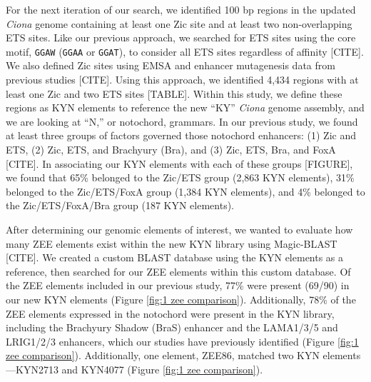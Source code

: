 For the next iteration of our search, we identified 100 bp regions in the updated \textit{Ciona} genome containing at least one Zic site and at least two non-overlapping ETS sites. Like our previous approach, we searched for ETS sites using the core motif, \verb|GGAW| (\verb|GGAA| or \verb|GGAT|), to consider all ETS sites regardless of affinity [CITE]. We also defined Zic sites using EMSA and enhancer mutagenesis data from previous studies [CITE]. Using this approach, we identified 4,434 regions with at least one Zic and two ETS sites [TABLE]. Within this study, we define these regions as KYN elements to reference the new “KY” \textit{Ciona} genome assembly, and we are looking at “N,” or notochord, grammars. In our previous study, we found at least three groups of factors governed those notochord enhancers: (1) Zic and ETS, (2) Zic, ETS, and Brachyury (Bra), and (3) Zic, ETS, Bra, and FoxA [CITE]. In associating our KYN elements with each of these groups [FIGURE], we found that 65\% belonged to the Zic/ETS group (2,863 KYN elements), 31\% belonged to the Zic/ETS/FoxA group (1,384 KYN elements), and 4\% belonged to the Zic/ETS/FoxA/Bra group (187 KYN elements). 

After determining our genomic elements of interest, we wanted to evaluate how many ZEE elements exist within the new KYN library using Magic-BLAST [CITE]. We created a custom BLAST database using the KYN elements as a reference, then searched for our ZEE elements within this custom database. Of the ZEE elements included in our previous study, 77\% were present (69/90) in our new KYN elements (Figure \ref{fig:1 zee comparison}). Additionally, 78\% of the ZEE elements expressed in the notochord were present in the KYN library, including the Brachyury Shadow (BraS) enhancer and the LAMA1/3/5 and LRIG1/2/3 enhancers, which our studies have previously identified (Figure \ref{fig:1 zee comparison}). Additionally, one element, ZEE86, matched two KYN elements—KYN2713 and KYN4077 (Figure \ref{fig:1 zee comparison}). 

